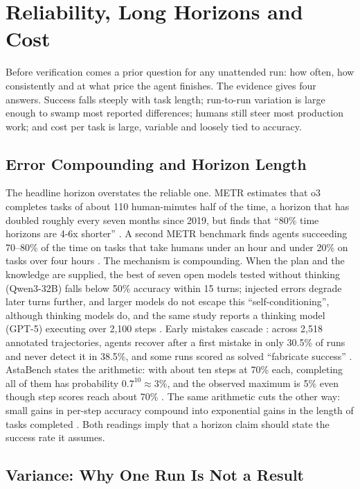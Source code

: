 \section{Reliability, Long Horizons and Cost}\label{sec:reliability}

Before verification comes a prior question for any unattended run: how often, how consistently and at what price the agent finishes. The evidence gives four answers. Success falls steeply with task length; run-to-run variation is large enough to swamp most reported differences; humans still steer most production work; and cost per task is large, variable and loosely tied to accuracy.

\subsection{Error Compounding and Horizon Length}

The headline horizon overstates the reliable one. METR estimates that o3 completes tasks of about 110 human-minutes half of the time, a horizon that has doubled roughly every seven months since 2019, but finds that ``80\% time horizons are 4-6x shorter'' \citep{F1}. A second METR benchmark finds agents succeeding 70--80\% of the time on tasks that take humans under an hour and under 20\% on tasks over four hours \citep{F38}. The mechanism is compounding. When the plan and the knowledge are supplied, the best of seven open models tested without thinking (Qwen3-32B) falls below 50\% accuracy within 15 turns; injected errors degrade later turns further, and larger models do not escape this ``self-conditioning'', although thinking models do, and the same study reports a thinking model (GPT-5) executing over 2,100 steps \citep{F3}. Early mistakes cascade \citep{F5}: across 2,518 annotated trajectories, agents recover after a first mistake in only 30.5\% of runs and never detect it in 38.5\%, and some runs scored as solved ``fabricate success'' \citep{F25}. AstaBench states the arithmetic: with about ten steps at 70\% each, completing all of them has probability $0.7^{10} \approx 3\%$, and the observed maximum is 5\% even though step scores reach about 70\% \citep[p.~10]{S19}. The same arithmetic cuts the other way: small gains in per-step accuracy compound into exponential gains in the length of tasks completed \citep{F3}. Both readings imply that a horizon claim should state the success rate it assumes.

\subsection{Variance: Why One Run Is Not a Result}

